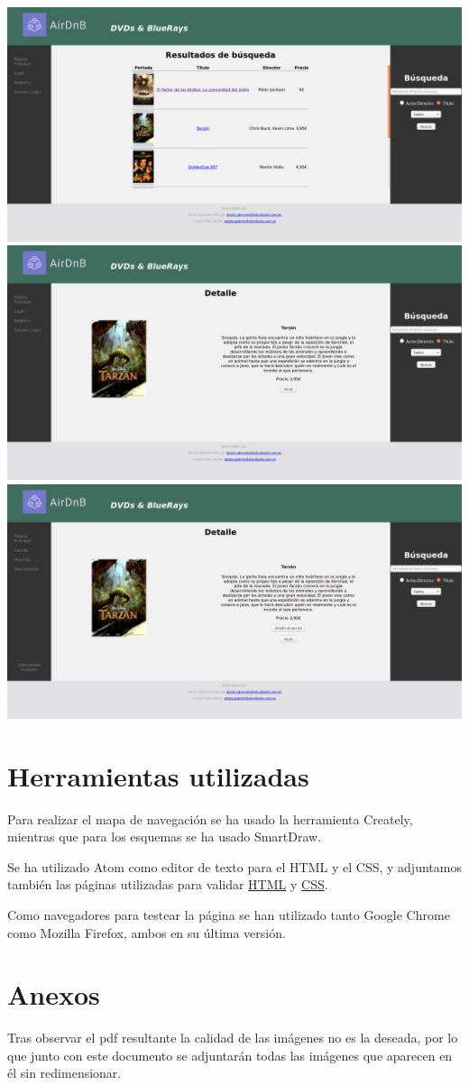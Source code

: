 \documentclass[]{article}
\begin{document}
\includegraphics[scale=0.2]{html/Busqueda.png}
\includegraphics[scale=0.2]{html/Detalle.png} 
\includegraphics[scale=0.2]{html/DetalleL.png}  

\section{Herramientas utilizadas}
Para realizar el mapa de navegación se ha usado la herramienta Creately, mientras que para los esquemas se ha usado SmartDraw.

Se ha utilizado Atom como editor de texto para el HTML y el CSS, y adjuntamos también las páginas utilizadas para validar \href{https://validator.w3.org/}{HTML} y \href{https://jigsaw.w3.org/css-validator/}{CSS}.

Como navegadores para testear la página se han utilizado tanto Google Chrome como Mozilla Firefox, ambos en su última versión.

\section{Anexos}
Tras observar el pdf resultante la calidad de las imágenes no es la deseada, por lo que junto con este documento se adjuntarán todas las imágenes que aparecen en él sin redimensionar.
\end{document}
